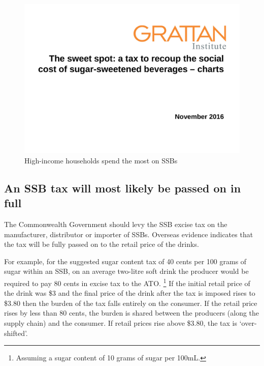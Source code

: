 \documentclass[embargoed]{grattan}
\begin{document}
\begin{figure}
\caption{High-income households spend the most on SSBs}\label{fig:High-income-households-spend-the-most-on-SSBs}

\includegraphics[page=11]{atlas/ObesityCharts}


\end{figure}

\subsection{An SSB tax will most likely be passed on in full}\label{an-ssb-tax-will-most-likely-be-passed-on-in-full}

The Commonwealth Government should levy the SSB excise tax on the manufacturer, distributor or importer of SSBs.
Overseas evidence indicates that the tax will be fully passed on to the retail price of the drinks.

For example, for the suggested sugar content tax of 40 cents per 100 grams of sugar within an SSB, on an average two-litre soft drink the producer would be required to pay 80 cents in excise tax to the ATO.%
\footnote{Assuming a sugar content of 10 grams of sugar per 100mL.} If the initial retail price of the drink was \$3 and the final price of the drink after the tax is imposed rises to \$3.80 then the burden of the tax falls entirely on the consumer.
If the retail price rises by less than 80 cents, the burden is shared between the producers (along the supply chain) and the consumer.
If retail prices rise above \$3.80, the tax is `over-shifted'.
\end{document}
